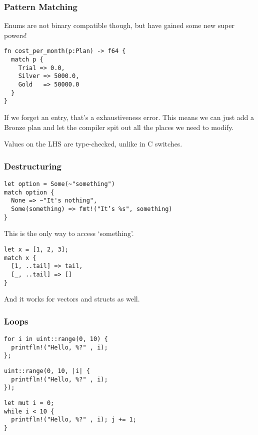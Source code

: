 \documentclass{beamer}
\begin{document}
\begin{frame}[fragile]
  \frametitle{Pattern Matching}

  Enums are not binary compatible though, but have gained some new super powers!

  \begin{verbatim}
fn cost_per_month(p:Plan) -> f64 {
  match p {
    Trial => 0.0,
    Silver => 5000.0,
    Gold   => 50000.0
  }
}
  \end{verbatim}

  If we forget an entry, that's a exhaustiveness error. This means we can just add a Bronze plan and let the compiler spit out all the places we need to modify.

  Values on the LHS are type-checked, unlike in C switches.
\end{frame}



\begin{frame}
  \frametitle{Destructuring}

  \begin{verbatim}
let option = Some(~"something")
match option {
  None => ~"It's nothing",
  Some(something) => fmt!("It’s %s", something)
}
  \end{verbatim}

  This is the only way to access `something'.

  \begin{verbatim}
let x = [1, 2, 3];
match x {
  [1, ..tail] => tail,
  [_, ..tail] => []
}
  \end{verbatim}

  And it works for vectors and structs as well.
\end{frame}



\begin{frame}[fragile]
  \frametitle{Loops}

  \begin{verbatim}
for i in uint::range(0, 10) {
  printfln!("Hello, %?" , i);
};
  \end{verbatim}

  \begin{verbatim}
uint::range(0, 10, |i| {
  printfln!("Hello, %?" , i);
});
  \end{verbatim}

  \begin{verbatim}
let mut i = 0;
while i < 10 {
  printfln!("Hello, %?" , i); j += 1;
}
  \end{verbatim}
\end{frame}
\end{document}
